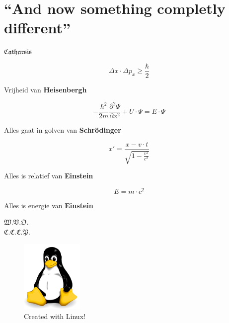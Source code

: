 \documentclass[a4paper,titlepage]{article}
\begin{document}
\appendix
\newpage
\printindex
\newpage
\section*{``And now something completly different''}
\begin{centering}
$\mathfrak{Catharsis}$
\end{centering}
\[
\Delta x\cdot\Delta p_x\geq\displaystyle\frac{\hbar}{2}
\]
\begin{flushright}
Vrijheid van \textbf{Heisenbergh}
\end{flushright}
\[
-\displaystyle\frac{\hbar^2}{2m}\displaystyle\frac{\partial^2\Psi}{\partial x^2}+U\cdot\Psi=E\cdot\Psi
\]
\begin{flushright}
Alles gaat in golven van \textbf{Schr\"odinger}
\end{flushright}
\[
x'=\displaystyle\frac{x-v\cdot t}{\sqrt{1-\displaystyle\frac{v^2}{c^2}}}
\]
\begin{flushright}
Alles is relatief van \textbf{Einstein}
\end{flushright}
\[
E=m\cdot c^2
\]
\begin{flushright}
Alles is energie van \textbf{Einstein}
\end{flushright}
$\mathfrak{W.V.O.}$\\%
$\mathfrak{C.C.C.P.}$%
\begin{figure}[b]
\centering
\includegraphics[width=3cm]{../SharedData/tux.pdf}
\caption{Created with Linux!}
\end{figure}
\end{document}
